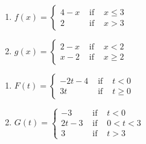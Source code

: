 \begin{multicols}{2}
\begin{enumerate}
\setcounter{enumi}{\value{HW}}

\item ${\displaystyle f(x) = \left\{ \begin{array}{rcl} 4-x & \mbox{ if } &  x \leq 3 \\
                                                            2 & \mbox{ if } & x > 3 
                                     \end{array} \right. }$   \label{graphpwiseexerfirst}

\item ${\displaystyle g(x) = \left\{ \begin{array}{rcl} 2-x & \mbox{ if } &  x < 2 \\
                                                            x-2 & \mbox{ if } & x \geq  2
                                     \end{array} \right. }$ 
                                     

\setcounter{HW}{\value{enumi}}
\end{enumerate}
\end{multicols}


\begin{multicols}{2}
\begin{enumerate}
\setcounter{enumi}{\value{HW}}

\item ${\displaystyle F(t) = \left\{ \begin{array}{rcl} -2t - 4 & \mbox{ if } &  t < 0 \\
                                                             3t & \mbox{ if } & t \geq 0 
                                     \end{array} \right. }$


\item ${\displaystyle G(t) = \left\{ \begin{array}{rcl}  -3 & \mbox{ if } & t < 0 \\
                                                        2t-3 & \mbox{ if } & 0 < t < 3 \\
                                                            3 & \mbox{ if } & t > 3  
                                     \end{array} \right. }$  \label{graphpwiseexerlast}



 \label{graphlineexerlast}

\setcounter{HW}{\value{enumi}}
\end{enumerate}
\end{multicols}

